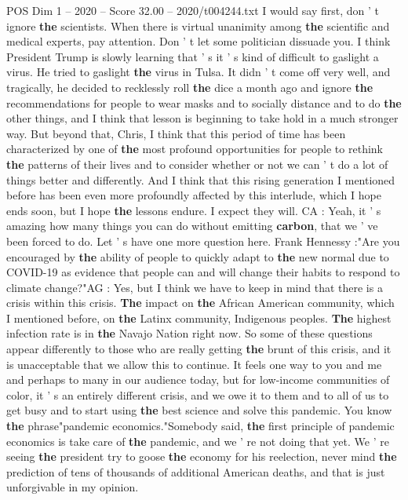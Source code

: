 \begin{textsample}{POS Dim 1 – 2020 – Score 32.00 – 2020/t004244.txt}
I would say first, don ' t ignore \textbf{the} scientists.
When there is virtual unanimity among \textbf{the} scientific and medical experts, pay attention.
Don ' t let some politician dissuade you.
I think President Trump is slowly learning that ' s it ' s kind of difficult to gaslight a virus.
He tried to gaslight \textbf{the} virus in Tulsa.
It didn ' t come off very well, and tragically, he decided to recklessly roll \textbf{the} dice a month ago and ignore \textbf{the} recommendations for people to wear masks and to socially distance and to do \textbf{the} other things, and I think that lesson is beginning to take hold in a much stronger way.
But beyond that, Chris, I think that this period of time has been characterized by one of \textbf{the} most profound opportunities for people to rethink \textbf{the} patterns of their lives and to consider whether or not we can ' t do a lot of things better and differently.
And I think that this rising generation I mentioned before has been even more profoundly affected by this interlude, which I hope ends soon, but I hope \textbf{the} lessons endure.
I expect they will.
CA : Yeah, it ' s amazing how many things you can do without emitting \textbf{carbon}, that we ' ve been forced to do.
Let ' s have one more question here.
Frank Hennessy :"Are you encouraged by \textbf{the} ability of people to quickly adapt to \textbf{the} new normal due to COVID-19 as evidence that people can and will change their habits to respond to climate change?"AG : Yes, but I think we have to keep in mind that there is a crisis within this crisis. \textbf{The} impact on \textbf{the} African American community, which I mentioned before, on \textbf{the} Latinx community, Indigenous peoples. \textbf{The} highest infection rate is in \textbf{the} Navajo Nation right now.
So some of these questions appear differently to those who are really getting \textbf{the} brunt of this crisis, and it is unacceptable that we allow this to continue.
It feels one way to you and me and perhaps to many in our audience today, but for low-income communities of color, it ' s an entirely different crisis, and we owe it to them and to all of us to get busy and to start using \textbf{the} best science and solve this pandemic.
You know \textbf{the} phrase"pandemic economics."Somebody said, \textbf{the} first principle of pandemic economics is take care of \textbf{the} pandemic, and we ' re not doing that yet.
We ' re seeing \textbf{the} president try to goose \textbf{the} economy for his reelection, never mind \textbf{the} prediction of tens of thousands of additional American deaths, and that is just unforgivable in my opinion.

\end{textsample}
